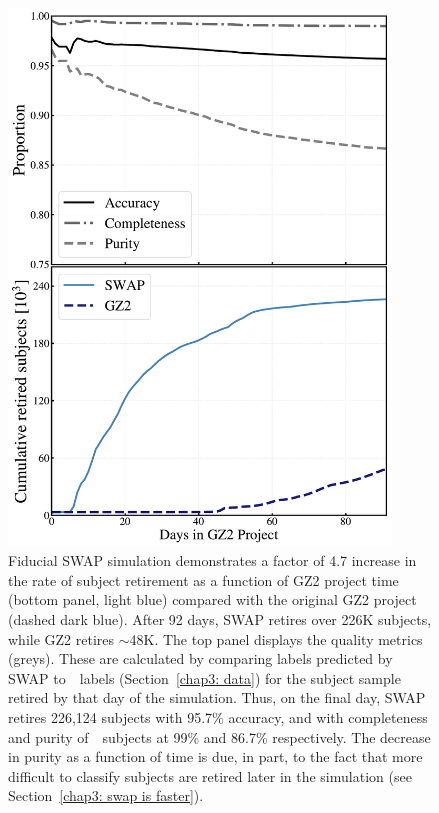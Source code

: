 \begin{figure}
\centering
\includegraphics[width=4in]{Figures/human_machine/f5.pdf}
\caption[Reprocessing GZ2 data with SWAP results in a factor of increase in the classification rate.]{Fiducial SWAP simulation demonstrates a factor of 4.7 increase in the rate of subject retirement as a function of GZ2 project time (bottom panel, light blue) compared with the original GZ2 project (dashed dark blue). After 92 days, SWAP retires over 226K subjects, while GZ2 retires $\sim$48K.  The top panel displays the quality metrics (greys). These are calculated by comparing labels predicted by SWAP to~\raw~labels (Section~\ref{chap3: data}) for the subject sample retired by that day of the simulation. Thus, on the final day, SWAP retires 226,124 subjects with 95.7\% accuracy,  and with completeness and purity of~\feat~subjects at 99\% and 86.7\% respectively. The decrease in purity as a function of time is due, in part, to the fact that more difficult to classify subjects are retired later in the simulation (see Section~\ref{chap3: swap is faster}).}
\label{fig: fiducial run}
\end{figure}
 
